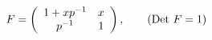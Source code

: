 \begin{equation}
F=\left(
\begin{array}{cc}
1+xp^{-1} & x \\
p^{-1}  & 1
\end{array}
\right),~~~~~~({\rm Det}~F=1)
\end{equation}


